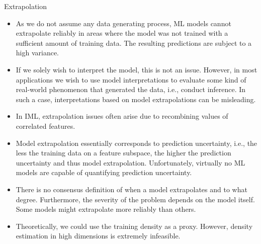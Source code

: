 \documentclass[11pt,compress,t,notes=noshow, xcolor=table]{beamer}
\begin{document}
\begin{vbframe}{Extrapolation}
\begin{itemize}
\itemsep2em
\item As we do not assume any data generating process, ML models cannot extrapolate reliably in areas where the model was not trained with a sufficient amount of training data. The resulting predictions are subject to a high variance.
\item If we solely wish to interpret the model, this is not an issue. However, in most applications we wish to use model interpretations to evaluate some kind of real-world phenomenon that generated the data, i.e., conduct inference. In such a case, interpretations based on model extrapolations can be misleading.
\item In IML, extrapolation issues often arise due to recombining values of correlated features.
\item Model extrapolation essentially corresponds to prediction uncertainty, i.e., the less the training data on a feature subspace, the higher the prediction uncertainty and thus model extrapolation. Unfortunately, virtually no ML models are capable of quantifying prediction uncertainty.
\item There is no consensus definition of when a model extrapolates and to what degree. Furthermore, the severity of the problem depends on the model itself. Some models might extrapolate more reliably than others.
\item Theoretically, we could use the training density as a proxy. However, density estimation in high dimensions is extremely infeasible.
\end{itemize}

\end{vbframe}
\end{document}

